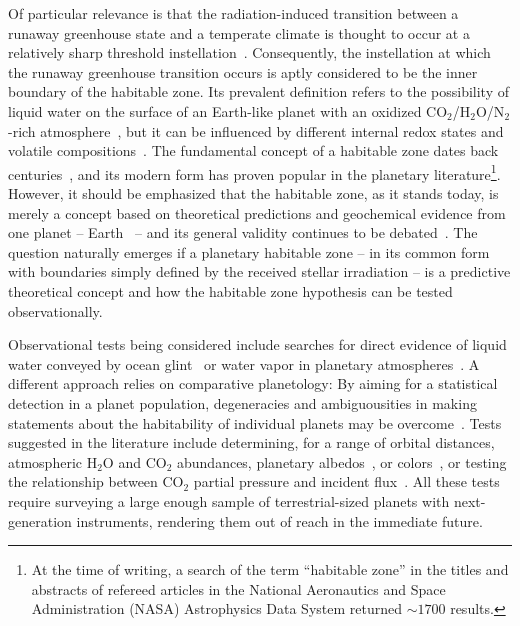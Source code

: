 \documentclass[twocolumn,twocolappendix]{aastex631}
\begin{document}
Of particular relevance is that the radiation-induced transition between a runaway greenhouse state and a temperate climate is thought to occur at a relatively sharp threshold instellation~\citep{2010ppc..book.....P,Kopparapu2013}.
Consequently, the instellation at which the runaway greenhouse transition occurs is aptly considered to be the inner boundary of the habitable zone.
Its prevalent definition refers to the possibility of liquid water on the surface of an Earth-like planet with an oxidized CO$_2$/H$_2$O/N$_2$-rich atmosphere~\citep[][]{Kasting1993,Kopparapu2013,Kopparapu2014}, but it can be influenced by different internal redox states and volatile compositions~\citep{2011ApJ...734L..13P,2017ApJ...837L...4R,2018ApJ...858...72R,2019ApJ...875...31K,2020ApJ...896..115G,2022JGRE..12707456G,2023ApJ...942L..20H}.
The fundamental concept of a habitable zone dates back centuries~\citep{Newton1687,Whewell1858,Shapley1953,Huang1959}, and its modern form has proven popular in the planetary literature\footnote{At the time of writing, a search of the term ``habitable zone'' in the titles and abstracts of refereed articles in the National Aeronautics and Space Administration (NASA) Astrophysics Data System returned $\sim\num{1700}$ results.}.
However, it should be emphasized that the habitable zone, as it stands today, is merely a concept based on theoretical predictions and geochemical evidence from one planet -- Earth~\citep{2020SciA....6.1420C} -- and its general validity continues to be debated~\citep[e.g.,][]{Cockell2016,Moore2017,Tuchow2023}.
The question naturally emerges if a planetary habitable zone -- in its common form with boundaries simply defined by the received stellar irradiation -- is a predictive theoretical concept and how the habitable zone hypothesis can be tested observationally.

Observational tests being considered include searches for direct evidence of liquid water conveyed by ocean glint~\citep{Williams2008,Robinson2010,Lustig-Yaeger2018} or water vapor in planetary atmospheres~\citep{Suissa2020}.
A different approach relies on comparative planetology: By aiming for a statistical detection in a planet population, degeneracies and ambiguousities in making statements about the habitability of individual planets may be overcome~\citep{Checlair2019,Apai2019a}.
Tests suggested in the literature include determining, for a range of orbital distances, atmospheric H$_{2}$O and CO$_2$ abundances, planetary albedos~\citep{Bean2017,Bixel2021}, or colors~\citep{Crow2011,Bixel2020}, or testing the relationship between CO$_2$ partial pressure and incident flux~\citep{Lehmer2020}.
All these tests require surveying a large enough sample of terrestrial-sized planets with next-generation instruments, rendering them out of reach in the immediate future.
\end{document}

